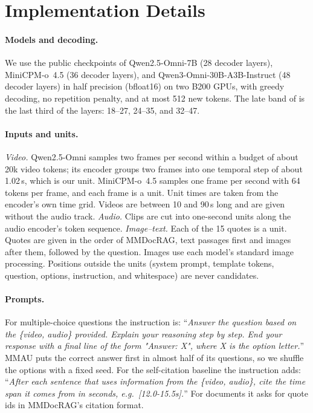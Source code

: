 \appendix

\section{Implementation Details}
\label{appendix:impl}

\paragraph{Models and decoding.}
We use the public checkpoints of Qwen2.5-Omni-7B (28 decoder layers), MiniCPM-o~4.5 (36 decoder layers), and Qwen3-Omni-30B-A3B-Instruct (48 decoder layers) in half precision (bfloat16) on two B200 GPUs, with greedy decoding, no repetition penalty, and at most 512 new tokens.
The late band of  is the last third of the layers: 18--27, 24--35, and 32--47.

\paragraph{Inputs and units.}
\emph{Video.} Qwen2.5-Omni samples two frames per second within a budget of about 20k video tokens; its encoder groups two frames into one temporal step of about 1.02\,s, which is our unit. MiniCPM-o~4.5 samples one frame per second with 64 tokens per frame, and each frame is a unit. Unit times are taken from the encoder's own time grid. Videos are between 10 and 90\,s long and are given without the audio track.
\emph{Audio.} Clips are cut into one-second units along the audio encoder's token sequence.
\emph{Image--text.} Each of the 15 quotes is a unit. Quotes are given in the order of MMDocRAG, text passages first and images after them, followed by the question. Images use each model's standard image processing.
Positions outside the units (system prompt, template tokens, question, options, instruction, and whitespace) are never candidates.

\paragraph{Prompts.}
For multiple-choice questions the instruction is: ``\emph{Answer the question based on the \{video, audio\} provided. Explain your reasoning step by step. End your response with a final line of the form "Answer: X", where X is the option letter.}''
MMAU puts the correct answer first in almost half of its questions, so we shuffle the options with a fixed seed.
For the self-citation baseline the instruction adds: ``\emph{After each sentence that uses information from the \{video, audio\}, cite the time span it comes from in seconds, e.g.\ [12.0-15.5s].}'' For documents it asks for quote ids in MMDocRAG's citation format.

